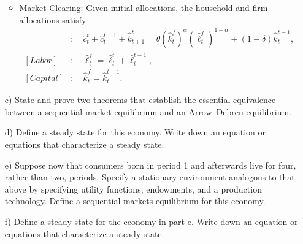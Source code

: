 \documentclass[11pt,english]{article}
\begin{document}
\begin{enumerate}
\begin{solution}
\begin{itemize}
\item \underline{Market Clearing:} Given initial allocations, the household and firm allocations satisfy
\begin{align*}
[Goods]&:\quad \hat{c}_t^t + \hat{c}_{t}^{t-1} + \hat{k}_{t+1}^t = \theta \left(\hat{k}_t^f\right)^\alpha\left(\hat{\ell}_t^f\right)^{1 - \alpha} + (1 - \delta) \hat{k}_t^{t-1},\\
[Labor]&:\quad \hat{\ell}_t^f = \hat{\ell}_t^t + \hat{\ell}_{t}^{t-1},\\
[Capital]&:\quad \hat{k}_t^f = \hat{k}_t^{t-1}.
\end{align*}
\end{itemize}
    \end{solution}
 
    \item[c)] State and prove two theorems that establish the essential
        equivalence between a sequential market equilibrium and an
        Arrow--Debreu equilibrium.
    \begin{solution}
 
    \end{solution}
 
    \item[d)] Define a steady state for this economy. Write down an equation or
        equations that characterize a steady state.
    \begin{solution}
 
    \end{solution}
 
    \item[e)] Suppose now that consumers born in period 1 and afterwards live
        for four, rather than two, periods. Specify a stationary environment
        analogous to that above by specifying utility functions, endowments, and
        a production technology. Define a sequential markets equilibrium for
        this economy.
    \begin{solution}
 
    \end{solution}
 
    \item[f)] Define a steady state for the economy in part e. Write down an
        equation or equations that characterize a steady state.
    \begin{solution}
 
    \end{solution}
\end{enumerate}
\end{document}
